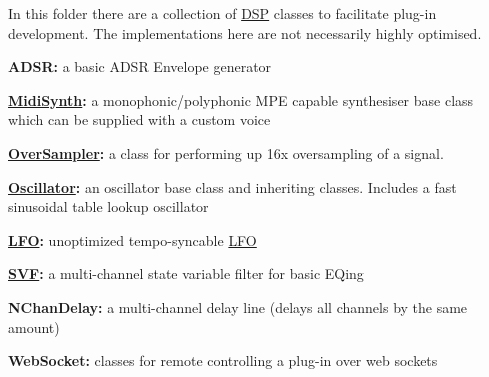 In this folder there are a collection of \mbox{\hyperlink{class_d_s_p}{D\+SP}} classes to facilitate plug-\/in development. The implementations here are not necessarily highly optimised.


\begin{DoxyItemize}
\item {\bfseries{A\+D\+SR\+:}} a basic A\+D\+SR Envelope generator
\item {\bfseries{\mbox{\hyperlink{class_midi_synth}{Midi\+Synth}}\+:}} a monophonic/polyphonic M\+PE capable synthesiser base class which can be supplied with a custom voice
\item {\bfseries{\mbox{\hyperlink{class_over_sampler}{Over\+Sampler}}\+:}} a class for performing up 16x oversampling of a signal.
\item {\bfseries{\mbox{\hyperlink{class_oscillator}{Oscillator}}\+:}} an oscillator base class and inheriting classes. Includes a fast sinusoidal table lookup oscillator
\item {\bfseries{\mbox{\hyperlink{class_l_f_o}{L\+FO}}\+:}} unoptimized tempo-\/syncable \mbox{\hyperlink{class_l_f_o}{L\+FO}}
\item {\bfseries{\mbox{\hyperlink{class_s_v_f}{S\+VF}}\+:}} a multi-\/channel state variable filter for basic E\+Qing
\item {\bfseries{N\+Chan\+Delay\+:}} a multi-\/channel delay line (delays all channels by the same amount)
\item {\bfseries{Web\+Socket\+:}} classes for remote controlling a plug-\/in over web sockets 
\end{DoxyItemize}